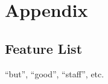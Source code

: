 \chapter{Appendix}

\section{Feature List}
\label{app:feature-list}

``but'', ``good'', ``staff'', etc.
